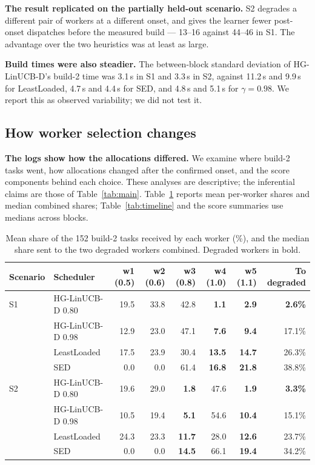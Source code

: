 \documentclass[final,5p,times,twocolumn]{elsarticle}
\begin{document}
\textbf{The result replicated on the partially held-out scenario.} S2 degrades a different pair of workers at a different onset, and gives the learner fewer post-onset dispatches before the measured build --- 13--16 against 44--46 in S1. The advantage over the two heuristics was at least as large.

\textbf{Build times were also steadier.} The between-block standard deviation of HG-LinUCB-D's build-2 time was 3.1\,s in S1 and 3.3\,s in S2, against 11.2\,s and 9.9\,s for LeastLoaded, 4.7\,s and 4.4\,s for SED, and 4.8\,s and 5.1\,s for $\gamma=0.98$. We report this as observed variability; we did not test it.

\subsection{How worker selection changes}
\label{sec:mech}

\textbf{The logs show how the allocations differed.} We examine where build-2 tasks went, how allocations changed after the confirmed onset, and the score components behind each choice. These analyses are descriptive; the inferential claims are those of Table~\ref{tab:main}. Table~\ref{tab:alloc} reports mean per-worker shares and median combined shares; Table~\ref{tab:timeline} and the score summaries use medians across blocks.

\begin{table}[t]
\centering
\caption{Mean share of the 152 build-2 tasks received by each worker (\%), and the median share sent to the two degraded workers combined. Degraded workers in bold.}
\label{tab:alloc}
\footnotesize
\begin{tabular}{llrrrrrr}
\toprule
Scenario & Scheduler & w1 (0.5) & w2 (0.6) & w3 (0.8) & w4 (1.0) & w5 (1.1) & To degraded \\
\midrule
S1 & HG-LinUCB-D 0.80 & 19.5 & 33.8 & 42.8 & \textbf{1.1} & \textbf{2.9} & \textbf{2.6\%} \\
 & HG-LinUCB-D 0.98 & 12.9 & 23.0 & 47.1 & \textbf{7.6} & \textbf{9.4} & 17.1\% \\
 & LeastLoaded & 17.5 & 23.9 & 30.4 & \textbf{13.5} & \textbf{14.7} & 26.3\% \\
 & SED & 0.0 & 0.0 & 61.4 & \textbf{16.8} & \textbf{21.8} & 38.8\% \\
\midrule
S2 & HG-LinUCB-D 0.80 & 19.6 & 29.0 & \textbf{1.8} & 47.6 & \textbf{1.9} & \textbf{3.3\%} \\
 & HG-LinUCB-D 0.98 & 10.5 & 19.4 & \textbf{5.1} & 54.6 & \textbf{10.4} & 15.1\% \\
 & LeastLoaded & 24.3 & 23.3 & \textbf{11.7} & 28.0 & \textbf{12.6} & 23.7\% \\
 & SED & 0.0 & 0.0 & \textbf{14.5} & 66.1 & \textbf{19.4} & 34.2\% \\
\bottomrule
\end{tabular}
\end{table}
\end{document}
